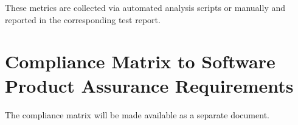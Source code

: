 \noindent
These metrics are collected via automated analysis scripts or manually and
reported in the corresponding test report.



\chapter{Compliance Matrix to Software Product Assurance Requirements}

The compliance matrix will be made available as a separate document.






